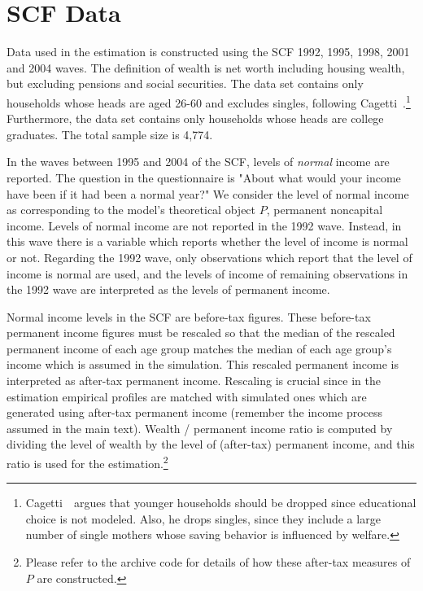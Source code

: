 
\hypertarget{scf-data}{}
\section{SCF Data}\label{app:scf-data}

Data used in the estimation is constructed using the SCF 1992, 1995, 1998, 2001 and 2004 waves. The definition of wealth is net worth including housing wealth, but excluding pensions and social securities. The data set contains only households whose heads are aged 26-60 and excludes singles, following Cagetti~\citeyearpar{cagettiWprofiles}.\footnote{Cagetti~\citeyearpar{cagettiWprofiles}\ argues that younger households should be dropped since educational choice is not modeled. Also, he drops singles, since they include a large number of single mothers whose saving behavior is influenced by welfare.} Furthermore, the data set contains only households whose heads are college graduates. The total sample size is 4,774.

In the waves between 1995 and 2004 of the SCF, levels of \textit{normal} income are reported. The question in the questionnaire is "About what would your income have been if it had been a normal year?" We consider the level of normal income as corresponding to the model's theoretical object $P$, permanent noncapital income. Levels of normal income are not reported in the 1992 wave. Instead, in this wave there is a variable which reports whether the level of income is normal or not. Regarding the 1992 wave, only observations which report that the level of income is normal are used, and the levels of income of remaining observations in the 1992 wave are interpreted as the levels of permanent income.

Normal income levels in the SCF are before-tax figures. These before-tax permanent income figures must be rescaled so that the median of the rescaled permanent income of each age group matches the median of each age group's income which is assumed in the simulation. This rescaled permanent income is interpreted as after-tax permanent income. Rescaling is crucial since in the estimation empirical profiles are matched with simulated ones which are generated using after-tax permanent income (remember the income process assumed in the main text). Wealth / permanent income ratio is computed by dividing the level of wealth by the level of (after-tax) permanent income, and this ratio is used for the estimation.\footnote{Please refer to the archive code for details of how these after-tax measures of $P$ are constructed.}

